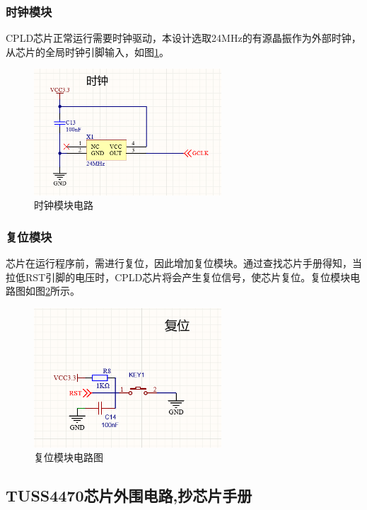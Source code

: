     
    \subsubsection{时钟模块}
    CPLD芯片正常运行需要时钟驱动，本设计选取24MHz的有源晶振作为外部时钟，从芯片的全局时钟引脚输入，如图\ref{时钟模块电路}。
    \begin{figure}[H]
        \centering
        \includegraphics[width=7cm]{figure/clock circuit.png}
        \songti{}\caption{时钟模块电路}
        \label{时钟模块电路}
    \end{figure}
    
    \subsubsection{复位模块}
    芯片在运行程序前，需进行复位，因此增加复位模块。通过查找芯片手册得知，当拉低RST引脚的电压时，CPLD芯片将会产生复位信号，使芯片复位。复位模块电路图如图\ref{复位模块电路图}所示。

    \begin{figure}[H]
        \centering
        \includegraphics[width=7cm]{figure/reset circuit.png}
        \songti{}\caption{复位模块电路图}
        \label{复位模块电路图}
    \end{figure}
    
    \newpage
    \subsection{TUSS4470芯片外围电路,抄芯片手册}
    
